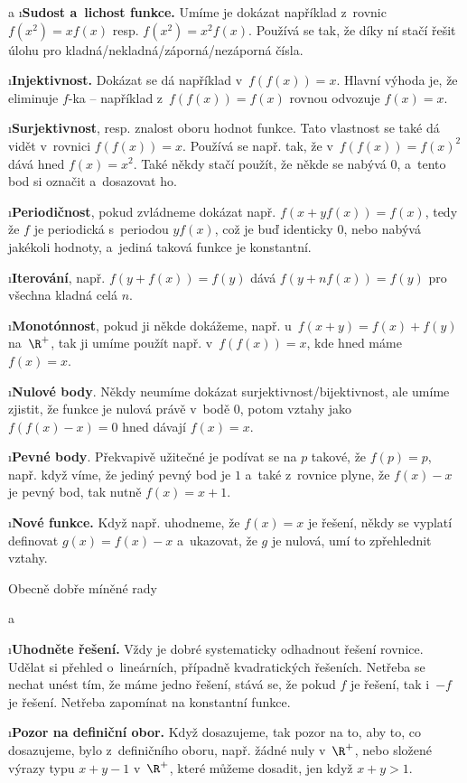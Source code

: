 \begitems \style a
\i \textbf{Sudost a~lichost funkce.} Umíme je dokázat například z~rovnic $f(x^2)=xf(x)$ resp. $f(x^2)=x^2f(x)$. Používá se tak, že díky ní stačí řešit úlohu pro kladná/nekladná/záporná/nezáporná čísla.

\i \textbf{Injektivnost.} Dokázat se dá například v~$f(f(x))=x$. Hlavní výhoda je, že eliminuje $f$-ka -- například z~$f(f(x))=f(x)$ rovnou odvozuje $f(x)=x$.

\i \textbf{Surjektivnost}, resp. znalost oboru hodnot funkce. Tato vlastnost se také dá vidět v~rovnici $f(f(x))=x$. Používá se např. tak, že v~$f(f(x))=f(x)^2$ dává hned $f(x)=x^2$. Také někdy stačí použít, že někde se nabývá $0$, a~tento bod si označit a~dosazovat ho.

\i \textbf{Periodičnost}, pokud zvládneme dokázat např. $f(x+yf(x))=f(x)$, tedy že $f$ je periodická s~periodou $yf(x)$, což je buď identicky $0$, nebo nabývá jakékoli hodnoty, a~jediná taková funkce je konstantní.

\i \textbf{Iterování}, např. $f(y+f(x))=f(y)$ dává $f(y+nf(x))=f(y)$ pro všechna kladná celá $n$.

\i \textbf{Monotónnost}, pokud ji někde dokážeme, např. u~$f(x+y)=f(x)+f(y)$ na~$\R^+$, tak ji umíme použít např. v~$f(f(x))=x$, kde hned máme $f(x)=x$.

\i \textbf{Nulové body}. Někdy neumíme dokázat surjektivnost/bijektivnost, ale umíme zjistit, že funkce je nulová právě v~bodě $0$, potom vztahy jako $f(f(x)-x)=0$ hned dávají $f(x)=x$.

\i \textbf{Pevné body}. Překvapivě užitečné je podívat se na $p$ takové, že $f(p)=p$, např. když víme, že jediný pevný bod je $1$ a~také z~rovnice plyne, že $f(x)-x$ je pevný bod, tak nutně $f(x)=x+1$.

\i \textbf{Nové funkce.} Když např. uhodneme, že $f(x)=x$ je řešení, někdy se vyplatí definovat $g(x)=f(x)-x$ a~ukazovat, že $g$ je nulová, umí to zpřehlednit vztahy.

\enditems

\sec Obecně dobře míněné rady

\begitems \style a

\i \textbf{Uhodněte řešení.} Vždy je dobré systematicky odhadnout řešení rovnice. Udělat si přehled o~lineárních,
případně kvadratických řešeních. Netřeba se nechat unést tím, že máme jedno
řešení, stává se, že pokud $f$ je řešení, tak i~$-f$ je řešení. Netřeba zapomínat na
konstantní funkce.

\i \textbf{Pozor na definiční obor.} Když dosazujeme, tak pozor na to, aby to, co dosazujeme, bylo z~definičního oboru, např. žádné nuly v~$\R^+$, nebo složené výrazy typu $x+y-1$ v~$\R^+$, které můžeme dosadit, jen když $x+y>1$.

